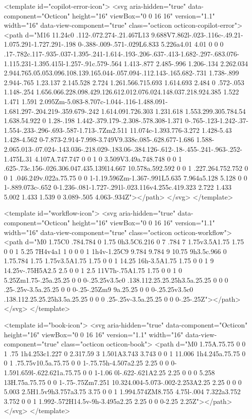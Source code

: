 <template id="copilot-error-icon">
  <svg aria-hidden="true" data-component="Octicon" height="16" viewBox="0 0 16 16" version="1.1" width="16" data-view-component="true" class="octicon octicon-copilot-error">
    <path d="M16 11.24c0 .112-.072.274-.21.467L13 9.688V7.862l-.023-.116c-.49.21-1.075.291-1.727.291-.198 0-.388-.009-.571-.029L6.833 5.226a4.01 4.01 0 0 0 .17-.782c.117-.935-.037-1.395-.241-1.614-.193-.206-.637-.413-1.682-.297-.683.076-1.115.231-1.395.415l-1.257-.91c.579-.564 1.413-.877 2.485-.996 1.206-.134 2.262.034 2.944.765.05.053.096.108.139.165.044-.057.094-.112.143-.165.682-.731 1.738-.899 2.944-.765 1.23.137 2.145.528 2.724 1.261.566.715.693 1.614.693 2.484 0 .572-.053 1.148-.254 1.656.066.228.098.429.126.612.012.076.024.148.037.218.924.385 1.522 1.471 1.591 2.095Zm-5.083-8.707c-1.044-.116-1.488.091-1.681.297-.204.219-.359.679-.242 1.614.091.726.303 1.231.618 1.553.299.305.784.54 1.638.54.922 0 1.28-.198 1.442-.379.179-.2.308-.578.308-1.371 0-.765-.123-1.242-.37-1.554-.233-.296-.693-.587-1.713-.7Zm2.511 11.074c-1.393.776-3.272 1.428-5.43 1.428-4.562 0-7.873-2.914-7.998-3.749V9.338c.085-.628.677-1.686 1.588-2.065.013-.07.024-.143.036-.218.029-.183.06-.384.126-.612-.18-.455-.241-.963-.252-1.475L.31 4.107A.747.747 0 0 1 0 3.509V3.49a.748.748 0 0 1 .625-.73c.156-.026.306.047.435.139l14.667 10.578a.592.592 0 0 1 .227.264.752.752 0 0 1 .046.249v.022a.75.75 0 0 1-1.19.596Zm-1.367-.991L5.635 7.964a5.128 5.128 0 0 1-.889.073c-.652 0-1.236-.081-1.727-.291l-.023.116v4.255c.419.323 2.722 1.433 5.002 1.433 1.539 0 3.089-.505 4.063-.934Z"></path>
</svg>
</template>

<template id="workflow-icon">
  <svg aria-hidden="true" data-component="Octicon" height="16" viewBox="0 0 16 16" version="1.1" width="16" data-view-component="true" class="octicon octicon-workflow">
    <path d="M0 1.75C0 .784.784 0 1.75 0h3.5C6.216 0 7 .784 7 1.75v3.5A1.75 1.75 0 0 1 5.25 7H4v4a1 1 0 0 0 1 1h4v-1.25C9 9.784 9.784 9 10.75 9h3.5c.966 0 1.75.784 1.75 1.75v3.5A1.75 1.75 0 0 1 14.25 16h-3.5A1.75 1.75 0 0 1 9 14.25v-.75H5A2.5 2.5 0 0 1 2.5 11V7h-.75A1.75 1.75 0 0 1 0 5.25Zm1.75-.25a.25.25 0 0 0-.25.25v3.5c0 .138.112.25.25.25h3.5a.25.25 0 0 0 .25-.25v-3.5a.25.25 0 0 0-.25-.25Zm9 9a.25.25 0 0 0-.25.25v3.5c0 .138.112.25.25.25h3.5a.25.25 0 0 0 .25-.25v-3.5a.25.25 0 0 0-.25-.25Z"></path>
</svg>
</template>

<template id="book-icon">
  <svg aria-hidden="true" data-component="Octicon" height="16" viewBox="0 0 16 16" version="1.1" width="16" data-view-component="true" class="octicon octicon-book">
    <path d="M0 1.75A.75.75 0 0 1 .75 1h4.253c1.227 0 2.317.59 3 1.501A3.743 3.743 0 0 1 11.006 1h4.245a.75.75 0 0 1 .75.75v10.5a.75.75 0 0 1-.75.75h-4.507a2.25 2.25 0 0 0-1.591.659l-.622.621a.75.75 0 0 1-1.06 0l-.622-.621A2.25 2.25 0 0 0 5.258 13H.75a.75.75 0 0 1-.75-.75Zm7.251 10.324.004-5.073-.002-2.253A2.25 2.25 0 0 0 5.003 2.5H1.5v9h3.757a3.75 3.75 0 0 1 1.994.574ZM8.755 4.75l-.004 7.322a3.752 3.752 0 0 1 1.992-.572H14.5v-9h-3.495a2.25 2.25 0 0 0-2.25 2.25Z"></path>
</svg>
</template>

